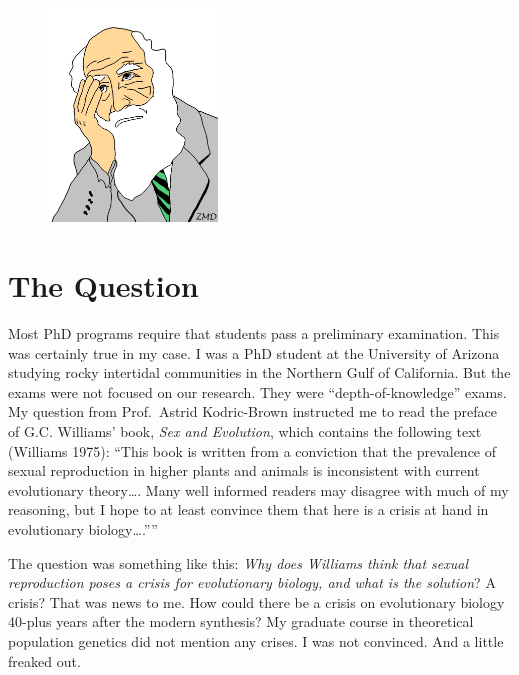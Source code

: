 \documentclass[
  letterpaper,
]{book}
\begin{document}
\begin{figure}

{\centering \includegraphics[width=0.4\textwidth,height=\textheight]{images/Picture1.png}

}

\end{figure}

\hypertarget{the-question}{%
\section{The Question}\label{the-question}}

Most PhD programs require that students pass a preliminary examination.
This was certainly true in my case. I was a PhD student at the
University of Arizona studying rocky intertidal communities in the
Northern Gulf of California. But the exams were not focused on our
research. They were ``depth-of-knowledge'' exams. My question from
Prof.~Astrid Kodric-Brown instructed me to read the preface of G.C.
Williams' book, \emph{Sex and Evolution}, which contains the following
text (Williams 1975): ``This book is written from a conviction that the
prevalence of sexual reproduction in higher plants and animals is
inconsistent with current evolutionary theory\ldots. Many well informed
readers may disagree with much of my reasoning, but I hope to at least
convince them that here is a crisis at hand in evolutionary
biology\ldots.''''

The question was something like this: \emph{Why does Williams think that
sexual reproduction poses a crisis for evolutionary biology, and what is
the solution}? A crisis? That was news to me. How could there be a
crisis on evolutionary biology 40-plus years after the modern synthesis?
My graduate course in theoretical population genetics did not mention
any crises. I was not convinced. And a little freaked out.
\end{document}
